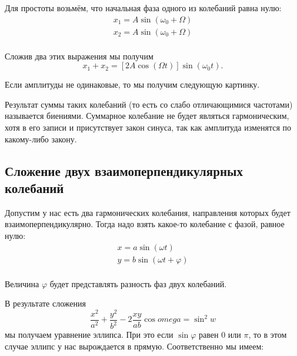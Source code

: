 Для простоты возьмём, что начальная фаза одного из колебаний равна нулю:
\begin{align*}
  x_1 = A \sin(\omega_0 + \Omega) \\
  x_2 = A \sin(\omega_0 + \Omega) \\
\end{align*}

Сложив два этих выражения мы получим \[
  x_1 + x_2 = [2 A \cos (\Omega t)] \sin (\omega_0 t)
.\]

Если амплитуды не одинаковые, то мы получим следующую картинку.

Результат суммы таких колебаний (то есть со слабо отличающимися частотами)
называется биениями. Суммарное колебание не будет являться гармоническим, хотя
в его записи и присутствует закон синуса, так как амплитуда изменятся по
какому-либо закону.

\subsection{Сложение двух взаимоперпендикулярных колебаний}

Допустим у нас есть два гармонических колебания, направления которых будет
взаимоперпендикулярно. Тогда надо взять какое-то колебание с фазой, равное нулю:
\begin{align*}
  x = a \sin(\omega t)           \\
  y = b \sin(\omega t + \varphi) \\
\end{align*}

Величина $\varphi$ будет представлять разность фаз двух колебаний.

В результате сложения \[
  \frac{x^2}{a^2 } + \frac{y^2}{b^2} - 2 \frac{x y}{a b} \cos{omega} = \sin^2 w
\] мы получаем уравнение эллипса. При это если $\sin \varphi$ равен $0$ или
$\pi$, то в этом случае эллипс у нас вырождается в прямую. Соответственно мы
имеем:

\begin{figure}[!htbp]
  \begin{center}
  \end{center}
\end{figure}

